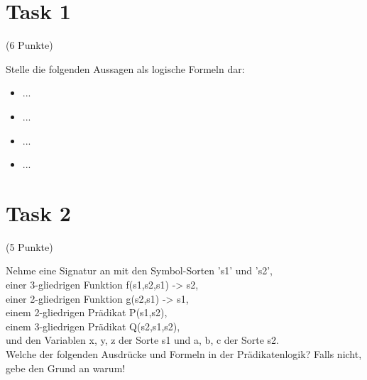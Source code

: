 \documentclass{exam}
\author{Valentin Richter}
\newcommand{\Punkte}[1]{\begin{flushright}(#1 Punkte)\end{flushright}}
\begin{document}
	
	\section{Task 1}
		
	\Punkte{6}
	
	Stelle die folgenden Aussagen als logische Formeln dar:
	
	\begin{itemize}
		
		\item ...
		\item ...
		\item ...
		\item ...
		
	\end{itemize}
	
	\clearpage
	\section{Task 2}
	
	\Punkte{5}
	
	Nehme eine Signatur an mit den Symbol-Sorten 's1' und 's2',\\
	einer 3-gliedrigen Funktion f(s1,s2,s1) -> s2,\\
	einer 2-gliedrigen Funktion g(s2,s1) -> s1,\\
	einem 2-gliedrigen Prädikat P(s1,s2),\\
	einem 3-gliedrigen Prädikat Q(s2,s1,s2),\\
	und den Variablen x, y, z der Sorte s1 und a, b, c der Sorte s2.\\
	Welche der folgenden Ausdrücke und Formeln in der Prädikatenlogik? Falls nicht, gebe den Grund an warum!
	
\end{document}
